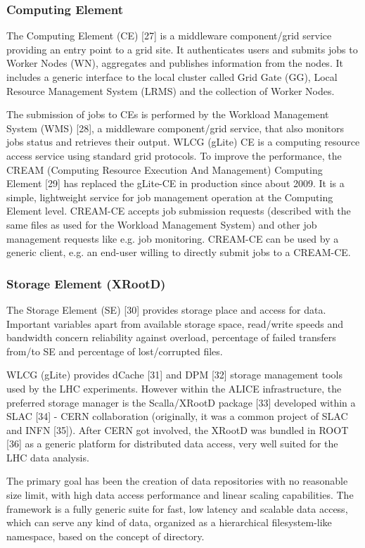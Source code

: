 \documentclass{intech}
\begin{document}
\subsubsection{Computing Element}
%
The Computing Element (CE) [27] is a middleware component/grid
service providing an entry point to a grid site. It authenticates
users and submits jobs to Worker Nodes (WN), aggregates and
publishes information from the nodes. It includes a generic
interface to the local cluster called Grid Gate (GG), Local Resource
Management System (LRMS) and the collection of Worker Nodes.

The submission of jobs to CEs is performed by the Workload
Management System (WMS) [28], a middleware component/grid service,
that also monitors jobs status and retrieves their output. WLCG
(gLite) CE is a computing resource access service using standard
grid protocols. To improve the performance, the CREAM (Computing
Resource Execution And Management) Computing Element [29] has
replaced the gLite-CE in production since about 2009. It is a
simple, lightweight service for job management operation at the
Computing Element level. CREAM-CE accepts job submission requests
(described with the same files as used for the Workload Management
System) and other job management requests like e.g. job monitoring.
CREAM-CE can be used by a generic client, e.g. an end-user willing
to directly submit jobs to a CREAM-CE.

\subsubsection{Storage Element (XRootD)}
%
The Storage Element (SE) [30] provides storage place and access for
data. Important variables apart from available storage space,
read/write speeds and bandwidth concern reliability against
overload, percentage of failed transfers from/to SE and percentage
of lost/corrupted files.

WLCG (gLite) provides dCache [31] and DPM [32] storage management
tools used by the LHC experiments. However within the ALICE
infrastructure, the preferred storage manager is the Scalla/XRootD
package [33] developed within a SLAC [34] - CERN collaboration
(originally, it was a common project of SLAC and INFN [35]). After
CERN got involved, the XRootD was bundled in ROOT [36] as a generic
platform for distributed data access, very well suited for the LHC
data analysis.

The primary goal has been the creation of data repositories with no
reasonable size limit, with high data access performance and linear
scaling capabilities. The framework is a fully generic suite for
fast, low latency and scalable data access, which can serve any kind
of data, organized as a hierarchical filesystem-like namespace,
based on the concept of directory.
\end{document}
